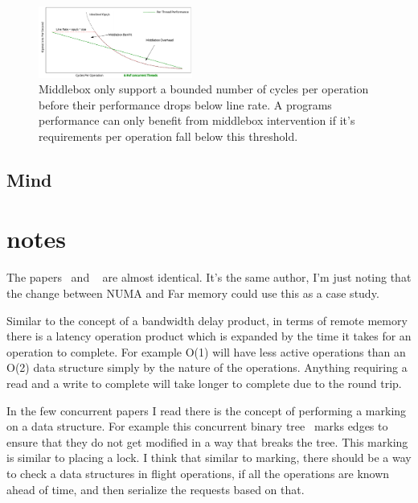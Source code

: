 \begin{figure}
    \includegraphics[width=0.45\textwidth]{fig/middlebox_model.png}

    \caption{Middlebox only support a bounded number of cycles per operation
    before their performance drops below line rate. A programs performance can
    only benefit from middlebox intervention if it's requirements per operation
    fall below this threshold.}

    \label{fig:middlebox_model}
\end{figure}

\subsection{Mind}



\section{notes}

The papers~\cite{one-sided-hash} and ~\cite{write-op-hash} are almost
identical. It's the same author, I'm just noting that the change between NUMA
and Far memory could use this as a case study.

Similar to the concept of a bandwidth delay product, in terms of remote memory
there is a latency operation product which is expanded by the time it takes for
an operation to complete. For example O(1) will have less active operations than
an O(2) data structure simply by the nature of the operations. Anything requiring
a read and a write to complete will take longer to complete due to the round
trip.

In the few concurrent papers I read there is the concept of performing a marking
on a data structure. For example this concurrent binary
tree~\cite{fast-concurrent-bin} marks edges to ensure that they do not get
modified in a way that breaks the tree. This marking is similar to placing a
lock. I think that similar to marking, there should be a way to check a data
structures in flight operations, if all the operations are known ahead of time,
and then serialize the requests based on that.

